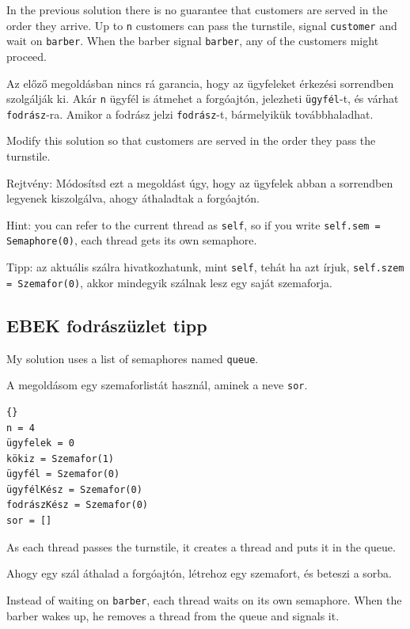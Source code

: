 \documentclass{book}
\newcommand{\clearemptydoublepage}{\newpage\cleardoublepage}
\begin{document}
In the previous solution there is no guarantee that customers are
served in the order they arrive.  Up to {\tt n} customers can pass
the turnstile, signal
{\tt customer} and wait on {\tt barber}.  When the barber signal
{\tt barber}, any of the customers might proceed.

Az előző megoldásban nincs rá garancia, hogy az ügyfeleket
érkezési sorrendben szolgálják ki. Akár {\tt n} ügyfél is átmehet a
forgóajtón, jelezheti {\tt ügyfél}-t, és várhat {\tt fodrász}-ra.
Amikor a fodrász jelzi {\tt fodrász}-t, bármelyikük továbbhaladhat.

Modify this solution so that customers are served in the order they
pass the turnstile.

Rejtvény: Módosítsd ezt a megoldást úgy, hogy az ügyfelek abban a sorrendben
legyenek kiszolgálva, ahogy áthaladtak a forgóajtón.

Hint: you can refer to the current thread as {\tt self}, so if you
write {\tt self.sem = Semaphore(0)}, each thread gets its own
semaphore.

Tipp: az aktuális szálra hivatkozhatunk, mint {\tt self}, tehát
ha azt írjuk, {\tt self.szem = Szemafor(0)}, akkor mindegyik
szálnak lesz egy saját szemaforja.

\clearemptydoublepage
\subsection{EBEK fodrászüzlet tipp}

My solution uses a list of semaphores named {\tt queue}.

A megoldásom egy szemaforlistát használ, aminek a neve {\tt sor}.



\begin{lstlisting}[title={EBEK fodrászüzlet tipp}]{}
n = 4
ügyfelek = 0
kökiz = Szemafor(1)
ügyfél = Szemafor(0)
ügyfélKész = Szemafor(0)
fodrászKész = Szemafor(0)
sor = []
\end{lstlisting}

As each thread passes the turnstile, it creates a thread and puts it
in the queue.

Ahogy egy szál áthalad a forgóajtón, létrehoz egy szemafort,
és beteszi a sorba.

Instead of waiting on {\tt barber}, each thread waits on its own
semaphore.  When the barber wakes up, he removes a thread from the queue and
signals it.
\end{document}

